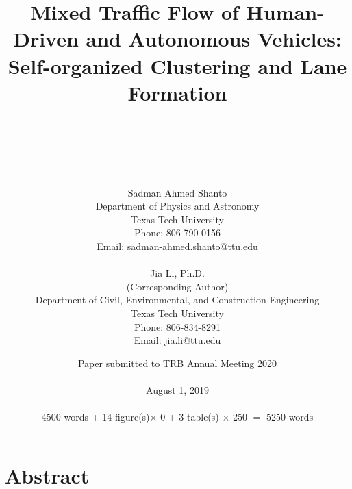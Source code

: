 \documentclass[oneside,letter,11pt]{article}
\begin{document}
\rm



\title{Mixed Traffic Flow of Human-Driven and Autonomous Vehicles: Self-organized Clustering and Lane Formation}


\author{
\\
\\
\\
\\
\\
Sadman Ahmed Shanto\\
Department of Physics and Astronomy\\
Texas Tech University\\
Phone: 806-790-0156\\
Email: sadman-ahmed.shanto@ttu.edu \\
\vspace{3ex}\\
Jia Li, Ph.D.\\
(Corresponding Author)\\
Department of Civil, Environmental, and Construction Engineering\\
Texas Tech University\\
Phone: 806-834-8291\\
Email: jia.li@ttu.edu\\
\vspace{3ex}
}
\date{
Paper submitted to TRB Annual Meeting 2020 \\
\medskip \\
August 1, 2019\\
\medskip\\
4500 words + 14 figure(s)$\times$ 0 + 3 table(s) $\times$ 250 $=$ 5250 words \\
}


\thispagestyle{empty}
\maketitle
\newpage



\section*{Abstract}
\end{document}
